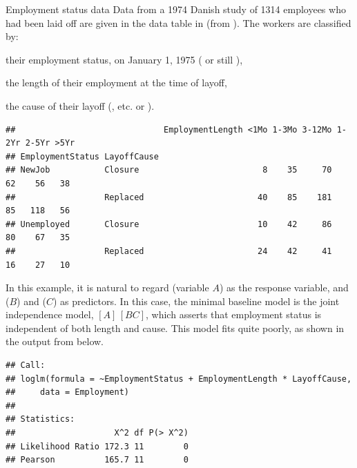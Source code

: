 \documentclass[11pt]{book}
\renewenvironment{knitrout}{\small\renewcommand{\baselinestretch}{.85}}{} %
\begin{document}
\begin{Example}[employ]{Employment status data}
Data from a 1974 Danish study of 1314 employees who had been laid off
are given in the data table  in 
(from \citet[Table 5.12]{Andersen:91}).
The workers are classified by:
\begin{seriate}
\item their employment status, on January 1, 1975 ( or still ),
\item the length of their employment at the time of layoff,
\item the cause of their layoff (, etc. or ).
\end{seriate}

\begin{knitrout}\footnotesize
{}\color{fgcolor}\begin{kframe}
\begin{alltt}
\hlstd{(}\hlstd{,}  \hlstd{=} \hlstd{)}
\end{alltt}
\begin{verbatim}
##                              EmploymentLength <1Mo 1-3Mo 3-12Mo 1-2Yr 2-5Yr >5Yr
## EmploymentStatus LayoffCause                                                    
## NewJob           Closure                         8    35     70    62    56   38
##                  Replaced                       40    85    181    85   118   56
## Unemployed       Closure                        10    42     86    80    67   35
##                  Replaced                       24    42     41    16    27   10
\end{verbatim}
\end{kframe}
\end{knitrout}

In this example, it is natural to regard  (variable $A$)
as the response variable,
and  ($B$) and  ($C$) as predictors. 
In this case, the minimal baseline model is the joint independence model,
\([A] \,  [BC] \), which asserts that  employment status is independent of both
length and cause.
This model fits quite poorly, as shown in the output from  below.
\begin{knitrout}
\color{fgcolor}\begin{kframe}
\begin{alltt}
\hlstd{(}\hlopt{~}  \hlopt{+} \hlopt{*} 
\end{alltt}
\begin{verbatim}
## Call:
## loglm(formula = ~EmploymentStatus + EmploymentLength * LayoffCause, 
##     data = Employment)
## 
## Statistics:
##                    X^2 df P(> X^2)
## Likelihood Ratio 172.3 11        0
## Pearson          165.7 11        0
\end{verbatim}
\end{kframe}
\end{knitrout}


\end{Example}
\end{document}
